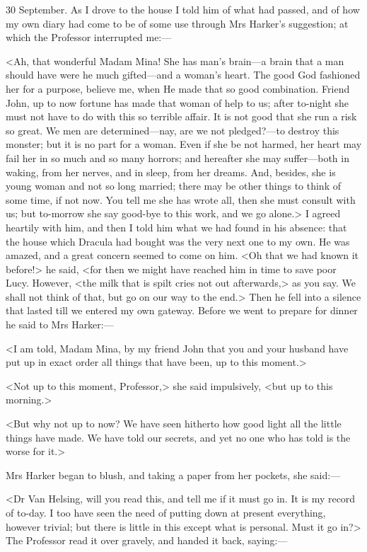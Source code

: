 \begin{diary}{30 September.}
As I drove to the house I told him of what had passed, and of how my own diary had come to be of some use through Mrs Harker's suggestion; at which the Professor interrupted me:—

<Ah, that wonderful Madam Mina! She has man's brain—a brain that a man should have were he much gifted—and a woman's heart. The good God fashioned her for a purpose, believe me, when He made that so good combination. Friend John, up to now fortune has made that woman of help to us; after to-night she must not have to do with this so terrible affair. It is not good that she run a risk so great. We men are determined—nay, are we not pledged?—to destroy this monster; but it is no part for a woman. Even if she be not harmed, her heart may fail her in so much and so many horrors; and hereafter she may suffer—both in waking, from her nerves, and in sleep, from her dreams. And, besides, she is young woman and not so long married; there may be other things to think of some time, if not now. You tell me she has wrote all, then she must consult with us; but to-morrow she say good-bye to this work, and we go alone.> I agreed heartily with him, and then I told him what we had found in his absence: that the house which Dracula had bought was the very next one to my own. He was amazed, and a great concern seemed to come on him. <Oh that we had known it before!> he said, <for then we might have reached him in time to save poor Lucy. However, <the milk that is spilt cries not out afterwards,> as you say. We shall not think of that, but go on our way to the end.> Then he fell into a silence that lasted till we entered my own gateway. Before we went to prepare for dinner he said to Mrs Harker:—

<I am told, Madam Mina, by my friend John that you and your husband have put up in exact order all things that have been, up to this moment.>

<Not up to this moment, Professor,> she said impulsively, <but up to this morning.>

<But why not up to now? We have seen hitherto how good light all the little things have made. We have told our secrets, and yet no one who has told is the worse for it.>

Mrs Harker began to blush, and taking a paper from her pockets, she said:—

<Dr Van Helsing, will you read this, and tell me if it must go in. It is my record of to-day. I too have seen the need of putting down at present everything, however trivial; but there is little in this except what is personal. Must it go in?> The Professor read it over gravely, and handed it back, saying:—


\end{diary}
